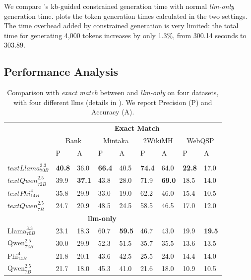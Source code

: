 We compare 's \ac{kb}-guided constrained generation time with normal \textit{\ac{llm}-only} generation time.
%
%
 plots the token generation times calculated in the two settings. The time overhead added by constrained generation is very limited: the total time for generating 4,000 tokens increases by only 1.3\%, from 300.14 seconds to 303.89.








\subsection{Performance Analysis}
\label{sec:performance}

\begin{table}[htbp]
\caption[Comparison with \textit{exact match} between  and \textit{\ac{llm}-only}.]{Comparison with \textit{exact match} between  and \textit{\ac{llm}-only} on four datasets, with four different \acp{llm} (details in ). We report Precision (P) and Accuracy (A). }
\label{tab:em_results_memorization}
\centering
\begin{tabular}{lll|ll|ll|ll}
\toprule
 & \multicolumn{8}{c}{\textbf{Exact Match}} \\
 & \multicolumn{2}{c|}{Bank} & \multicolumn{2}{c|}{Mintaka} & \multicolumn{2}{c|}{2WikiMH} & \multicolumn{2}{c}{WebQSP} \\
 & P & A & P & A & P & A & P & A  \\
\midrule
\multicolumn{8}{c}{\textbf{}} \\
$text{Llama}^{3.3}_{70B}$ & \textbf{40.8} & 36.0 & \textbf{66.4} & 40.5 & \textbf{74.4} & 64.0 & \textbf{22.8} & 17.0  \\
$text{Qwen}^{2.5}_{72B}$ & 39.9 & \textbf{37.1} & 43.8 & 28.0 & 71.9 & \textbf{69.0} & 18.5 & 14.0  \\
$text{Phi}^{4}_{14B}$ & 35.8 & 29.9 & 33.0 & 19.0 & 62.2 & 46.0 & 15.4 & 10.5  \\
$text{Qwen}^{2.5}_{7B}$ & 24.7 & 20.9 & 48.5 & 24.5 & 58.5 & 46.5 & 17.0 & 12.0  \\
\midrule
\multicolumn{8}{c}{\textbf{\acs{llm}-only}} \\
$\text{Llama}^{3.3}_{70B}$ & 23.1 & 18.3 & 60.7 & \textbf{59.5} & 46.7 & 43.0 & 19.9 & \textbf{19.5}  \\
$\text{Qwen}^{2.5}_{72B}$ & 30.0 & 29.9 & 52.3 & 51.5 & 35.7 & 35.5 & 13.6 & 13.5  \\
$\text{Phi}^{4}_{14B}$ & 21.8 & 20.1 & 43.6 & 42.5 & 25.5 & 24.0 & 14.4 & 14.0  \\
$\text{Qwen}^{2.5}_{7B}$ & 21.7 & 18.0 & 45.3 & 41.0 & 21.6 & 18.0 & 10.9 & 10.5  \\
\bottomrule
\end{tabular}
\end{table}


